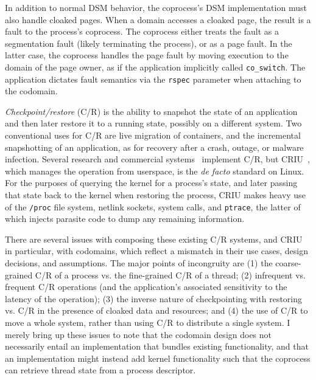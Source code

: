 In addition to normal DSM behavior, the coprocess's DSM implementation must
also handle cloaked pages.
%
When a domain accesses a cloaked page, the result is a fault to the process's
coprocess.
%
The coprocess either treats the fault as a segmentation fault (likely
terminating the process), or as a page fault.
%
In the latter case, the coprocess handles the page fault by moving execution to
the domain of the page owner, as if the application implicitly called
\texttt{co\_switch}.
%
The application dictates fault semantics via the \texttt{rspec} parameter when
attaching to the codomain.


%
\emph{Checkpoint/restore} (C/R) is the ability to snapshot the state of an
application and then later restore it to a running state, possibly
on a different system.
%
Two conventional uses for C/R are live migration of containers,
and the incremental snapshotting of an application, as for recovery
after a crash, outage, or malware infection.
%
Several research and commercial
systems~\cite{transparent-process-migration,dmtcp,popcorn-migration} implement
C/R, but CRIU~\cite{criu}, which manages the operation from userspace, is the
\emph{de facto} standard on Linux.
%
For the purposes of querying the kernel for a process's state, and later
passing that state back to the kernel when restoring the process,
CRIU makes heavy use of the \texttt{/proc} file system, netlink sockets,
system calls, and \texttt{ptrace}, the latter of which injects parasite code
to dump any remaining information.


There are several issues with composing these existing C/R systems, and CRIU in
particular, with codomains, which reflect a mismatch in their use cases, design
decisions, and assumptions.
%
The major points of incongruity are (1) the coarse-grained C/R of a process vs.
the fine-grained C/R of a thread; (2) infrequent vs. frequent C/R operations
(and the application's associated sensitivity to the latency of the operation);
(3) the inverse nature of checkpointing with restoring vs. C/R in the presence
of cloaked data and resources; and (4) the use of C/R to move a whole system,
rather than using C/R to distribute a single system.
%
I merely bring up these issues to note that the codomain design does not
necessarily entail an implementation that bundles existing functionality, and
that an implementation might instead add kernel functionality such that the
coprocess can retrieve thread state from a process descriptor.


